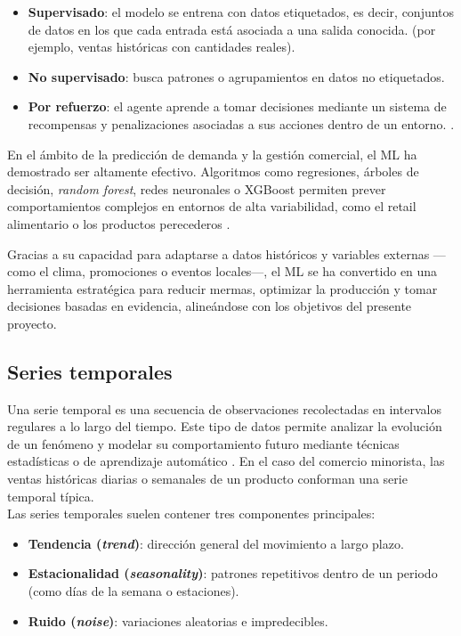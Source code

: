 \begin{itemize}
    \item \textbf{Supervisado}: el modelo se entrena con datos etiquetados, es decir, conjuntos de datos en los que cada entrada está asociada a una salida conocida. (por ejemplo, ventas históricas con cantidades reales).
    
    \item \textbf{No supervisado}: busca patrones o agrupamientos en datos no etiquetados.
    
    \item \textbf{Por refuerzo}:  el agente aprende a tomar decisiones mediante un sistema de recompensas y penalizaciones asociadas a sus acciones dentro de un entorno. \parencite{sutton2018}.
\end{itemize}

En el ámbito de la predicción de demanda y la gestión comercial, el ML ha demostrado ser altamente efectivo. Algoritmos como regresiones, árboles de decisión, \textit{random forest}, redes neuronales o XGBoost permiten prever comportamientos complejos en entornos de alta variabilidad, como el retail alimentario o los productos perecederos \parencite{carbonneau2008}.

Gracias a su capacidad para adaptarse a datos históricos y variables externas —como el clima, promociones o eventos locales—, el ML se ha convertido en una herramienta estratégica para reducir mermas, optimizar la producción y tomar decisiones basadas en evidencia, alineándose con los objetivos del presente proyecto.

\subsection{Series temporales}

Una serie temporal es una secuencia de observaciones recolectadas en intervalos regulares a lo largo del tiempo. Este tipo de datos permite analizar la evolución de un fenómeno y modelar su comportamiento futuro mediante técnicas estadísticas o de aprendizaje automático \parencite{chatfield2004}. En el caso del comercio minorista, las ventas históricas diarias o semanales de un producto conforman una serie temporal típica.\\

Las series temporales suelen contener tres componentes principales:

\begin{itemize}
    \item \textbf{Tendencia (\textit{trend})}: dirección general del movimiento a largo plazo.
    
    \item \textbf{Estacionalidad (\textit{seasonality})}: patrones repetitivos dentro de un periodo (como días de la semana o estaciones).
    
    \item \textbf{Ruido (\textit{noise})}: variaciones aleatorias e impredecibles.
\end{itemize}

